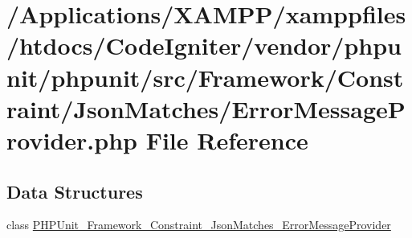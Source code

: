 \hypertarget{_error_message_provider_8php}{}\section{/\+Applications/\+X\+A\+M\+P\+P/xamppfiles/htdocs/\+Code\+Igniter/vendor/phpunit/phpunit/src/\+Framework/\+Constraint/\+Json\+Matches/\+Error\+Message\+Provider.php File Reference}
\label{_error_message_provider_8php}
\subsection*{Data Structures}
\begin{DoxyCompactItemize}
\item 
class \mbox{\hyperlink{class_p_h_p_unit___framework___constraint___json_matches___error_message_provider}{P\+H\+P\+Unit\+\_\+\+Framework\+\_\+\+Constraint\+\_\+\+Json\+Matches\+\_\+\+Error\+Message\+Provider}}
\end{DoxyCompactItemize}
